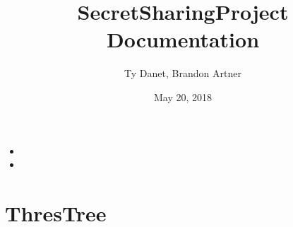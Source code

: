 \documentclass[letterpaper,10pt,english]{sphinxmanual}
\title{SecretSharingProject Documentation}
\date{May 20, 2018}
\author{Ty Danet, Brandon Artner}
\begin{document}
\maketitle
\sphinxtableofcontents
{}\label{\detokenize{index::doc}}

\begin{itemize}
\item {} 

\item {} 

\end{itemize}
\label{\detokenize{index:module-ThresTree}}

\chapter{ThresTree}
\label{\detokenize{index:threstree}}\label{\detokenize{index:secret-sharing-capstone}}
\end{document}

